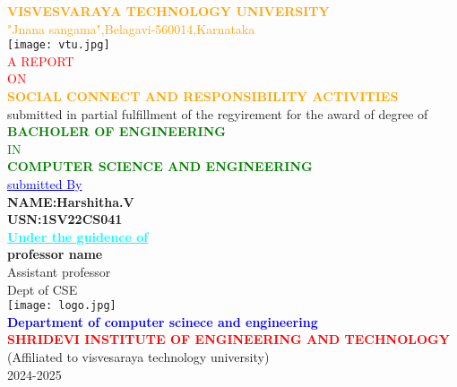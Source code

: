 \documentclass[12pt,a4paper]{article}
\begin{document}
   \begin{center}
   \textcolor{orange}{\large\textbf{VISVESVARAYA TECHNOLOGY UNIVERSITY}\\
   "Jnana sangama",Belagavi-560014,Karnataka}\\
     \vspace{2mm}
      \texttt{[image: vtu.jpg]}\\
     \vspace{2mm}
      \textcolor{red}{A REPORT}\\
      \textcolor{red}{ON}\\
      \textcolor{orange}{\textbf{SOCIAL CONNECT AND RESPONSIBILITY ACTIVITIES}}\\
      \small{submitted in partial fulfillment of the regyirement for the award of degree of}\\
      \vspace{5mm}
       \textcolor{green}{\textbf{BACHOLER OF ENGINEERING}\\
IN\\
\textbf{COMPUTER SCIENCE AND ENGINEERING}}\\
\vspace{5mm}
\textcolor{blue}{\underline{submitted By}}\\
\textbf{NAME:Harshitha.V}\\
\textbf{USN:1SV22CS041}\\
\vspace{5mm}
\textcolor{cyan}{\underline{{\textbf{Under the guidence of}}}}\\
\large\textbf{professor name}\\
Assistant professor\\
Dept of CSE\\
\centering\texttt{[image: logo.jpg]}\\
\textcolor{blue}{\textbf{Department of computer scinece and engineering}}\\
\textcolor{red}{\textbf{SHRIDEVI INSTITUTE OF ENGINEERING AND TECHNOLOGY}}\\
(Affiliated to visvesaraya technology university)\\
2024-2025
\end{center}
\end{document}
